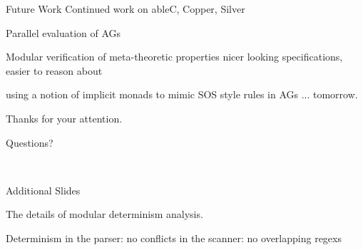 \documentclass[notes,11pt,aspectratio=169]{beamer}
\newcommand{\ableC}{\textsc{ableC}}
\newcommand{\silver}{\textsc{Silver}}
\begin{document}

\begin{frame}{Future Work}
\biA
 \x Continued work on ableC, Copper, Silver

 \x Parallel evaluation of AGs

 \x Modular verification of meta-theoretic properties
  \bi
   \x nicer looking specifications, easier to reason about

   \x using a notion of implicit monads to mimic SOS style rules in
      AGs ... tomorrow.
  \ei
\ei
\end{frame}


\begin{frame}
\begin{center}
Thanks for your attention.

\vskip 1cm
Questions?

\vskip 1cm

 \ \ \ \ 
\end{center}
\end{frame}


\begin{frame}{Additional Slides}

\vskip 0.6cm
The details of modular determinism analysis.

\vskip 1cm
Determinism
\bi
\x in the parser: no conflicts
\x in the scanner: no overlapping regexs
\ei
\end{frame}
\end{document}
